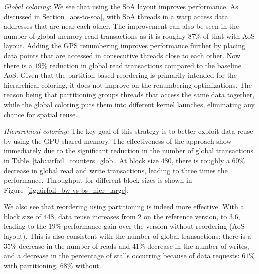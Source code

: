 \emph{Global coloring}: We see that using the SoA layout improves performance. 
As discussed in Section~\ref{aos-to-soa}, with SoA threads in a warp access data 
addresses that are near each other. The improvement can also be seen in 
the number of global memory read transactions as it is roughly $87\%$ of that 
with AoS layout. Adding the GPS renumbering improves performance 
further by placing data points that are accessed in consecutive threads close 
to each other. Now there is a $19\%$ reduction in global read transactions 
compared to the baseline AoS. Given that the partition based reordering is 
primarily intended for the hierarchical coloring, it does not improve on the 
renumbering optimizations. The reason being that partitioning groups threads 
that access the same data together, while the global coloring puts them into 
different kernel launches, eliminating any chance for spatial reuse.

\emph{Hierarchical coloring:}  The key goal of this strategy is to better 
exploit data reuse by using the GPU shared memory. The effectiveness of the 
approach show immediately due to the significant reduction in the number of 
global transactions in Table~\ref{tab:airfoil_counters_glob}. At block size 
$480$, there is roughly a $60\%$ decrease in global read and write 
transactions, leading to three times the performance. Throughput for different 
block sizes is shown in Figure~\ref{fig:airfoil_bw-vs-bs_hier_large}.

We also see that reordering using partitioning is indeed more effective. With
a block size of 448, data reuse increases from $2$ on the reference version,
to $3.6$, leading to the $19\%$ performance gain over the version without
reordering (AoS layout). This is also consistent with the number of global
transactions: there is a $35\%$ decrease in the number of reads and $41\%$
decrease in the number of writes, and a decrease in the percentage of stalls
occurring because of data requests: $61\%$ with partitioning, $68\%$ without.

